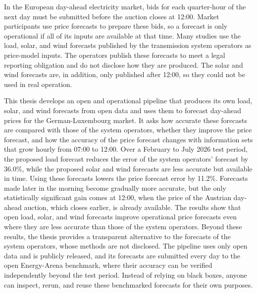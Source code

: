 In the European day-ahead electricity market, bids for each quarter-hour of the
next day must be submitted before the auction closes at 12:00.
Market participants use price forecasts to prepare these bids, so a forecast is
only operational if all of its inputs are available at that time. Many studies use the
load, solar, and wind forecasts published by the transmission system operators as
price-model inputs. The operators publish
these forecasts to meet a legal reporting obligation and do not disclose how they
are produced. The solar and wind forecasts are, in addition, only published after
12:00, so they could not be used in real operation.

This thesis develops an open and operational pipeline that produces its own load,
solar, and wind forecasts from open data and uses them to forecast day-ahead
prices for the German-Luxembourg market. It asks how accurate these forecasts are
compared with those of the system operators, whether they improve the price
forecast, and how the accuracy of the price forecast changes with information sets that grow hourly
from 07:00 to 12:00. Over a February to July 2026 test period, the
proposed load forecast reduces the error of the system operators' forecast by
36.0\%, while the proposed solar and wind forecasts are less accurate but
available in time. Using these forecasts lowers the price forecast error by
11.2\%. Forecasts made later in the morning become gradually more accurate, but the
only statistically significant gain comes at 12:00, when the price of the
Austrian day-ahead auction, which closes earlier, is already available. The results show that open
load, solar, and wind forecasts improve operational price forecasts even where
they are less accurate than those of the system operators. Beyond these results, the thesis provides
a transparent alternative to the forecasts of the system operators, whose methods
are not disclosed.
The pipeline uses only open data and is publicly released, and its forecasts are
submitted every day to the open Energy-Arena benchmark, where their accuracy can be
verified independently beyond the test period. Instead of relying on black boxes, anyone can inspect, rerun, and reuse
these benchmarked forecasts for their own purposes.
